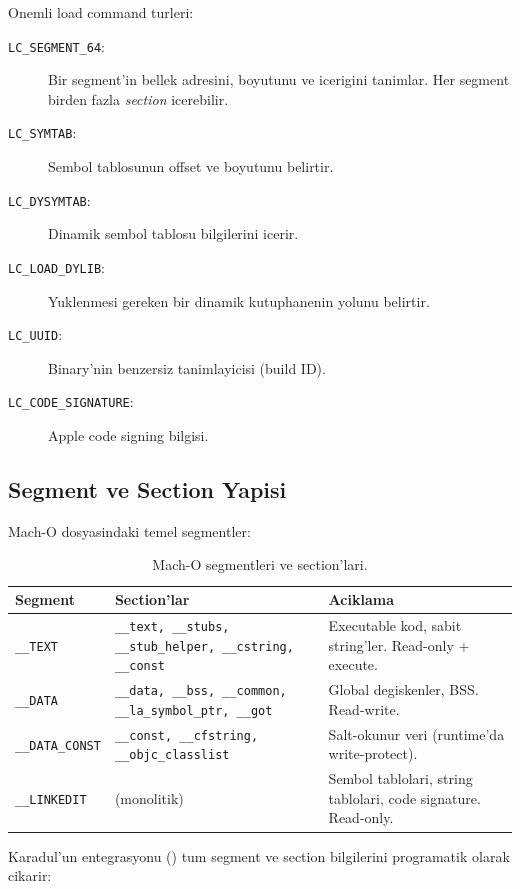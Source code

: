 Onemli load command turleri:

\begin{description}
\item[\texttt{LC\_SEGMENT\_64}:] Bir segment'in bellek adresini, boyutunu ve icerigini tanimlar. Her segment birden fazla \emph{section} icerebilir.
\item[\texttt{LC\_SYMTAB}:] Sembol tablosunun offset ve boyutunu belirtir.
\item[\texttt{LC\_DYSYMTAB}:] Dinamik sembol tablosu bilgilerini icerir.
\item[\texttt{LC\_LOAD\_DYLIB}:] Yuklenmesi gereken bir dinamik kutuphanenin yolunu belirtir.
\item[\texttt{LC\_UUID}:] Binary'nin benzersiz tanimlayicisi (build ID).
\item[\texttt{LC\_CODE\_SIGNATURE}:] Apple code signing bilgisi.
\end{description}

\subsection{Segment ve Section Yapisi}

Mach-O dosyasindaki temel segmentler:

\begin{table}[htbp]
\centering
\begin{tabular}{llp{7cm}}
\toprule
\textbf{\color{sectioncyan}Segment} & \textbf{\color{sectioncyan}Section'lar} & \textbf{\color{sectioncyan}Aciklama} \\
\midrule
\texttt{\_\_TEXT} & \texttt{\_\_text, \_\_stubs, \_\_stub\_helper, \_\_cstring, \_\_const} & Executable kod, sabit string'ler. Read-only + execute. \\
\texttt{\_\_DATA} & \texttt{\_\_data, \_\_bss, \_\_common, \_\_la\_symbol\_ptr, \_\_got} & Global degiskenler, BSS. Read-write. \\
\texttt{\_\_DATA\_CONST} & \texttt{\_\_const, \_\_cfstring, \_\_objc\_classlist} & Salt-okunur veri (runtime'da write-protect). \\
\texttt{\_\_LINKEDIT} & (monolitik) & Sembol tablolari, string tablolari, code signature. Read-only. \\
\bottomrule
\end{tabular}
\caption{Mach-O segmentleri ve section'lari.}
\label{tab:macho-segments}
\end{table}

Karadul'un  entegrasyonu () tum segment ve section bilgilerini programatik olarak cikarir:

